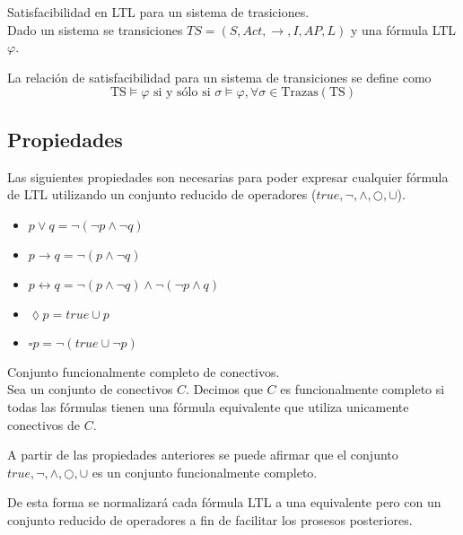 \begin{definicion}
Satisfacibilidad en LTL para un sistema de trasiciones.\\
Dado un sistema se transiciones $TS = (S, Act, \rightarrow, I, AP, L)$ y una fórmula LTL $\varphi$.

La relación de satisfacibilidad para un sistema de transiciones se define como 
\[ \text{TS} \models \varphi \text{ si y sólo si } \sigma \models \varphi, \forall \sigma \in \text{Trazas} (\text{TS}) \]
\end{definicion}







\subsection{Propiedades}
Las siguientes propiedades son necesarias para poder expresar cualquier fórmula de LTL utilizando
 un conjunto reducido de operadores ($true, \lnot, \land, \bigcirc, \cup$).

\begin{itemize}
\item $p \lor q = \lnot (\lnot p \land \lnot q)$
\item $p \rightarrow q = \lnot (p \land \lnot q)$
\item $p \leftrightarrow q = \lnot (p \land \lnot q) \land \lnot (\lnot p \land q)$
\item $\lozenge p = true \cup p$
\item $\square p = \lnot (true \cup \lnot p)$
\end{itemize}


\begin{definicion}
Conjunto funcionalmente completo de conectivos.\\
Sea un conjunto de conectivos $C$. Decimos que $C$ es funcionalmente completo si todas las fórmulas
tienen una fórmula equivalente que utiliza unicamente conectivos de $C$.
\end{definicion}


A partir de las propiedades anteriores se puede afirmar que el conjunto {$true, \lnot, \land, \bigcirc, \cup$}
 es un conjunto funcionalmente completo.


De esta forma se normalizará cada fórmula LTL a una equivalente pero con un conjunto reducido de operadores
 a fin de facilitar los prosesos posteriores.
